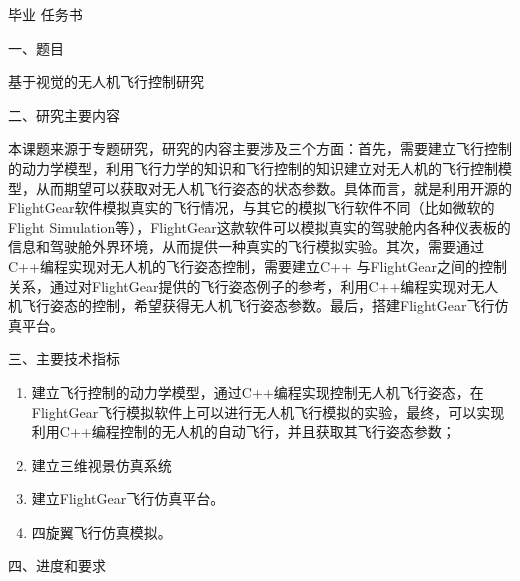 
\pagestyle{empty}
\voffset 0.8cm
\begin{center}
{\fontsize{36pt}{36pt}\hei 毕业
任务书}
\end{center}


{\noindent\sihao\hei 一、题目}\vspace{1ex}

基于视觉的无人机飞行控制研究\vspace{1.5ex}

{\noindent\sihao\hei 二、研究主要内容}\vspace{1ex}

本课题来源于专题研究，研究的内容主要涉及三个方面：首先，需要建立飞行控制的动力学模型，利用飞行力学的知识和飞行控制的知识建立对无人机的飞行控制模型，从而期望可以获取对无人机飞行姿态的状态参数。具体而言，就是利用开源的FlightGear软件模拟真实的飞行情况，与其它的模拟飞行软件不同（比如微软的Flight Simulation等），FlightGear这款软件可以模拟真实的驾驶舱内各种仪表板的信息和驾驶舱外界环境，从而提供一种真实的飞行模拟实验。其次，需要通过C++编程实现对无人机的飞行姿态控制，需要建立C++ 与FlightGear之间的控制关系，通过对FlightGear提供的飞行姿态例子的参考，利用C++编程实现对无人机飞行姿态的控制，希望获得无人机飞行姿态参数。最后，搭建FlightGear飞行仿真平台。
\vspace{2ex}

{\noindent\sihao\hei 三、主要技术指标}
\vspace{-5pt}
\begin{enumerate}  \setlength{\itemsep}{-5pt}
\item 建立飞行控制的动力学模型，通过C++编程实现控制无人机飞行姿态，在FlightGear飞行模拟软件上可以进行无人机飞行模拟的实验，最终，可以实现利用C++编程控制的无人机的自动飞行，并且获取其飞行姿态参数；
\item 建立三维视景仿真系统
\item 建立FlightGear飞行仿真平台。
\item 四旋翼飞行仿真模拟。
\end{enumerate}
\vspace{1ex}

{\noindent\sihao\hei 四、进度和要求} \vspace{1ex}

